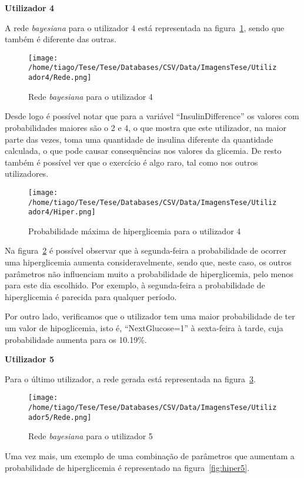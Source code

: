 \textbf{Utilizador 4}

A rede \textit{bayesiana} para o utilizador 4 está representada na figura~\ref{fig:sam4}, sendo que também é diferente das outras. 

\begin{figure}[H]
\centering
\texttt{[image: /home/tiago/Tese/Tese/Databases/CSV/Data/ImagensTese/Utilizador4/Rede.png]}
\caption{Rede \textit{bayesiana} para o utilizador 4}
\label{fig:sam4}
\end{figure}
Desde logo é possível notar que para a variável ``Insulin\textunderscore Difference'' os valores com probabilidades maiores são o 2 e 4, o que mostra que este utilizador, na maior parte das vezes, toma uma quantidade de insulina diferente da quantidade calculada, o que pode causar consequências nos valores da glicemia. De resto também é possível ver que o exercício é algo raro, tal como nos outros utilizadores. 


\begin{figure}[H]
\centering
\texttt{[image: /home/tiago/Tese/Tese/Databases/CSV/Data/ImagensTese/Utilizador4/Hiper.png]}
\caption{Probabilidade máxima de hiperglicemia para o utilizador 4}
\label{fig:hiper4}
\end{figure}
Na figura~\ref{fig:hiper4} é possível observar que à segunda-feira a probabilidade de ocorrer uma hiperglicemia aumenta consideravelmente, sendo que, neste caso, os outros parâmetros não influenciam muito a probabilidade de hiperglicemia, pelo menos para este dia escolhido. Por exemplo, à segunda-feira a probabilidade de hiperglicemia é parecida para qualquer período.

Por outro lado, verificamos que o utilizador tem uma maior probabilidade de ter um valor de hipoglicemia, isto é, ``Next\textunderscore Glucose=1'' à sexta-feira à tarde, cuja probabilidade aumenta para os 10.19\%.


\textbf{Utilizador 5}


Para o último utilizador, a rede gerada está representada na figura~\ref{fig:sam5}.

\begin{figure}[H]
\centering
\texttt{[image: /home/tiago/Tese/Tese/Databases/CSV/Data/ImagensTese/Utilizador5/Rede.png]}
\caption{Rede \textit{bayesiana} para o utilizador 5}
\label{fig:sam5}
\end{figure}
Uma vez mais, um exemplo de uma combinação de parâmetros que aumentam a probabilidade de hiperglicemia é representado na figura~\ref{fig:hiper5}.


